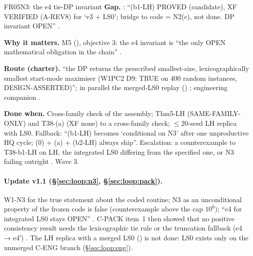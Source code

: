 \begin{card}{FR05}{N3: the e4 tie-DP invariant}
\textbf{Gap.} : ``(b1-LH) PROVED (candidate), XF VERIFIED (A-REV8) for `v3 + LS0'; bridge to code = N2(c), not done. DP invariant OPEN'' .

\textbf{Why it matters.} M5 (), objective 3: the e4 invariant is ``the only OPEN mathematical obligation in the chain'' .

\textbf{Route (charter).} ``the DP returns the prescribed smallest-size, lexicographically smallest start-mode maximiser (W1PC2 D9: TRUE on 400 random instances, DESIGN-ASSERTED)''; in parallel the merged-LS0 replay () ; engineering companion .

\textbf{Done when.} Cross-family check of the assembly; Thm5-LH (SAME-FAMILY-ONLY) and T38-(a) (XF none) to a cross-family check; $\le20$-seed LH replica with LS0. Fallback: ``(b1-LH) becomes `conditional on N3' after one unproductive HQ cycle; (0) + (a) + (b2-LH) always ship''. Escalation: a counterexample to T38-b1-LH on LH, the integrated LS0 differing from the specified one, or N3 failing outright . Wave 3.
\paragraph{Update v1.1 (\S\ref{sec:loop:n3}, \S\ref{sec:loop:pack}).} W1-N3  for the true statement about the coded routine; N3 as an unconditional property of the frozen code is false (counterexample above the cap $10^6$); ``e4 for integrated LS0 stays OPEN'' . C-PACK item~1 then showed that no positive consistency result needs the lexicographic tie rule or the truncation fallback (e4 → e4′) . The LH replica with a merged LS0 () is not done: LS0 exists only on the unmerged C-ENG branch (\S\ref{sec:loop:eng}).

\end{card}

